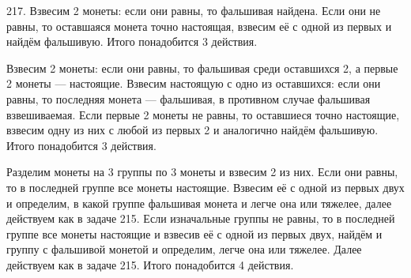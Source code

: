 217. Взвесим 2 монеты: если они равны, то фальшивая найдена. Если они не равны, то оставшаяся монета точно настоящая, взвесим её с одной из первых и найдём фальшивую. Итого понадобится 3 действия.

Взвесим 2 монеты: если они равны, то фальшивая среди оставшихся 2, а первые 2 монеты --- настоящие. Взвесим настоящую с одно из оставшихся: если они равны, то последняя монета --- фальшивая, в противном случае фальшивая взвешиваемая. Если первые 2 монеты не равны, то оставшиеся точно настоящие, взвесим одну из них с любой из первых 2 и аналогично найдём фальшивую. Итого понадобится 3 действия.

Разделим монеты на 3 группы по 3 монеты и взвесим 2 из них. Если они равны, то в последней группе все монеты настоящие. Взвесим её с одной из первых двух и определим, в какой группе фальшивая монета и легче она или тяжелее, далее действуем как в задаче 215. Если изначальные группы не равны, то в последней группе все монеты настоящие и взвесив её с одной из первых двух, найдём и группу с фальшивой монетой и определим, легче она или тяжелее. Далее действуем как в задаче 215. Итого понадобится 4 действия.\\
